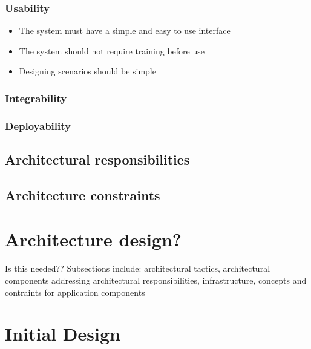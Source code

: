 \documentclass[a4paper,12pt]{article}
\begin{document}
\subsubsection{Usability}
	\begin{itemize}
		\item The system must have a simple and easy to use interface
		\item The system should not require training before use
		\item Designing scenarios should be simple
	\end{itemize}

\subsubsection{Integrability}

\subsubsection{Deployability}

\subsection{Architectural responsibilities}

\subsection{Architecture constraints}

\section{Architecture design?}
	Is this needed?? Subsections include: architectural tactics, architectural components addressing architectural responsibilities, infrastructure, concepts and contraints for application components

\newpage
%
%




\section{Initial Design}  %


\newpage
%
%
\end{document}
